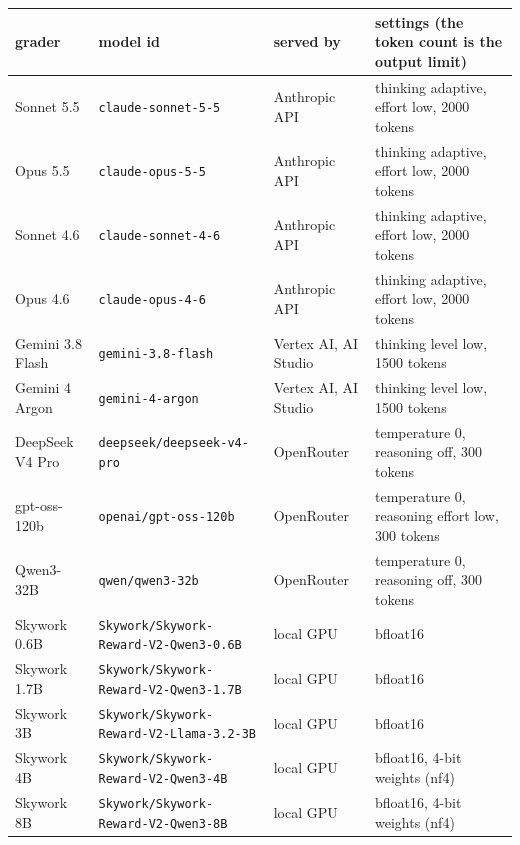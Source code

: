 {\scriptsize\setlength{\tabcolsep}{4pt}
\begin{tabular}{@{}l>{\raggedright\arraybackslash}p{4.55cm}>{\raggedright\arraybackslash}p{2.65cm}>{\raggedright\arraybackslash}p{5.95cm}@{}}
\toprule
grader & model id & served by & settings (the token count is the output limit) \\
\midrule
Sonnet 5.5 & \texttt{claude-sonnet-5-5} & Anthropic API & thinking adaptive, effort low, 2000 tokens \\
Opus 5.5 & \texttt{claude-opus-5-5} & Anthropic API & thinking adaptive, effort low, 2000 tokens \\
Sonnet 4.6 & \texttt{claude-sonnet-4-6} & Anthropic API & thinking adaptive, effort low, 2000 tokens \\
Opus 4.6 & \texttt{claude-opus-4-6} & Anthropic API & thinking adaptive, effort low, 2000 tokens \\
Gemini 3.8 Flash & \texttt{gemini-3.8-flash} & Vertex AI, AI Studio & thinking level low, 1500 tokens \\
Gemini 4 Argon & \texttt{gemini-4-argon} & Vertex AI, AI Studio & thinking level low, 1500 tokens \\
DeepSeek V4 Pro & \texttt{deepseek/\allowbreak deepseek-v4-pro} & OpenRouter & temperature 0, reasoning off, 300 tokens \\
gpt-oss-120b & \texttt{openai/\allowbreak gpt-oss-120b} & OpenRouter & temperature 0, reasoning effort low, 300 tokens \\
Qwen3-32B & \texttt{qwen/\allowbreak qwen3-32b} & OpenRouter & temperature 0, reasoning off, 300 tokens \\
\midrule
Skywork 0.6B & \texttt{Skywork/\allowbreak Skywork-Reward-V2-Qwen3-0.6B} & local GPU & bfloat16 \\
Skywork 1.7B & \texttt{Skywork/\allowbreak Skywork-Reward-V2-Qwen3-1.7B} & local GPU & bfloat16 \\
Skywork 3B & \texttt{Skywork/\allowbreak Skywork-Reward-V2-Llama-3.2-3B} & local GPU & bfloat16 \\
Skywork 4B & \texttt{Skywork/\allowbreak Skywork-Reward-V2-Qwen3-4B} & local GPU & bfloat16, 4-bit weights (nf4) \\
Skywork 8B & \texttt{Skywork/\allowbreak Skywork-Reward-V2-Qwen3-8B} & local GPU & bfloat16, 4-bit weights (nf4) \\
\bottomrule
\end{tabular}}

